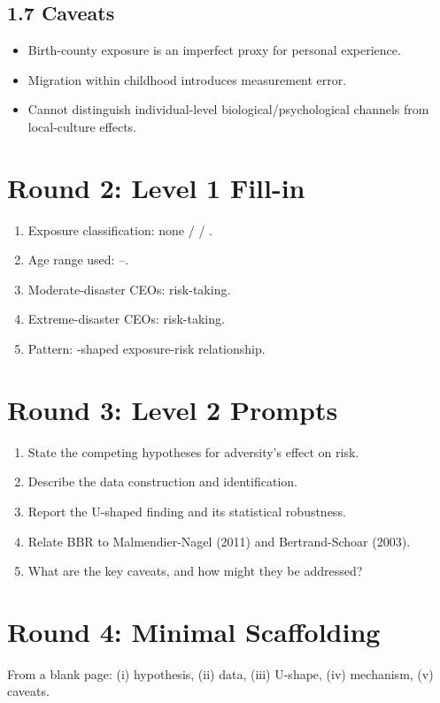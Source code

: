 \documentclass[11pt]{article}
\newcommand{\blank}[1]{\underline{\hspace{#1}}}
\begin{document}
\subsection*{1.7 Caveats}
\begin{alertbox}
\begin{itemize}
\item Birth-county exposure is an imperfect proxy for personal experience.
\item Migration within childhood introduces measurement error.
\item Cannot distinguish individual-level biological/psychological channels from local-culture effects.
\end{itemize}
\end{alertbox}

\section*{Round 2: Level 1 Fill-in}
\begin{enumerate}
\item Exposure classification: none / \blank{2cm} / \blank{1.5cm}.
\item Age range used: \blank{1cm}--\blank{1cm}.
\item Moderate-disaster CEOs: \blank{1cm} risk-taking.
\item Extreme-disaster CEOs: \blank{1cm} risk-taking.
\item Pattern: \blank{1cm}-shaped exposure-risk relationship.
\end{enumerate}

\section*{Round 3: Level 2 Prompts}
\begin{enumerate}
\item State the competing hypotheses for adversity's effect on risk.
\item Describe the data construction and identification.
\item Report the U-shaped finding and its statistical robustness.
\item Relate BBR to Malmendier-Nagel (2011) and Bertrand-Schoar (2003).
\item What are the key caveats, and how might they be addressed?
\end{enumerate}

\section*{Round 4: Minimal Scaffolding}
From a blank page: (i) hypothesis, (ii) data, (iii) U-shape, (iv) mechanism, (v) caveats.
\end{document}
